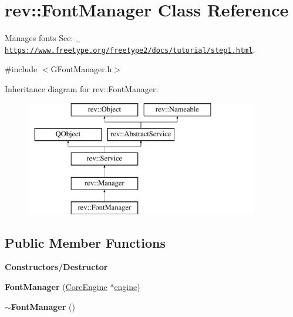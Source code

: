 \hypertarget{classrev_1_1_font_manager}{}\section{rev\+::Font\+Manager Class Reference}
\label{classrev_1_1_font_manager}


Manages fonts See\+: \href{https://www.freetype.org/freetype2/docs/tutorial/step1.html}{\texttt{ https\+://www.\+freetype.\+org/freetype2/docs/tutorial/step1.\+html}}.  




{\ttfamily \#include $<$G\+Font\+Manager.\+h$>$}

Inheritance diagram for rev\+::Font\+Manager\+:\begin{figure}[H]
\begin{center}
\leavevmode
\includegraphics[height=5.000000cm]{classrev_1_1_font_manager}
\end{center}
\end{figure}
\subsection*{Public Member Functions}
\begin{Indent}\textbf{ Constructors/\+Destructor}\par
\begin{DoxyCompactItemize}
\item 
\mbox{\label{classrev_1_1_font_manager_a96ee88f9dd01c910842436b8fa798e2d}} 
{\bfseries Font\+Manager} (\mbox{\hyperlink{classrev_1_1_core_engine}{Core\+Engine}} $\ast$\mbox{\hyperlink{classrev_1_1_manager_a0fbd0df6b4f3caf42b557f9702f48171}{engine}})
\item 
\mbox{\label{classrev_1_1_font_manager_a4b9035da7a5eaae37bd3b5a07cd10bd0}} 
{\bfseries $\sim$\+Font\+Manager} ()
\end{DoxyCompactItemize}
\end{Indent}
